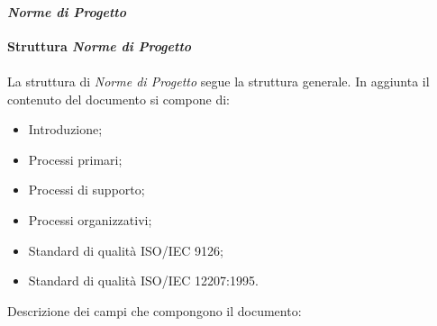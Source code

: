 \paragraph{\textit{Norme di Progetto}}
\textbf{Struttura \textit{Norme di Progetto}}
\\\\
La struttura di \textit{Norme di Progetto} segue la struttura generale.
In aggiunta il contenuto del documento si compone di:
\begin{itemize}
    \item Introduzione;
    \item Processi primari;
    \item Processi di supporto;
    \item Processi organizzativi;
    \item Standard di qualità ISO/IEC 9126;
    \item Standard di qualità ISO/IEC 12207:1995.
\end{itemize}
Descrizione dei campi che compongono il documento:
